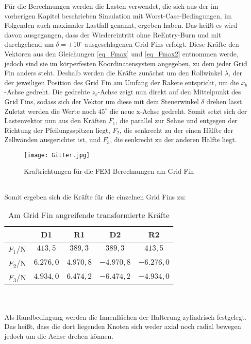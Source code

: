Für die Berechnungen werden die Lasten verwendet, die sich aus der im vorherigen Kapitel beschrieben Simulation mit Worst-Case-Bedingungen, im Folgenden auch maximaler Lastfall genannt, ergeben haben. Das heißt es wird davon ausgegangen, dass der Wiedereintritt ohne ReEntry-Burn und mit durchgehend um $\delta = \pm 10^\circ$ ausgeschlagenen Grid Fins erfolgt. Diese Kräfte den Vektoren aus den Gleichungen \ref{eq_Fmax} und \ref{eq_Fmax2} entnommen werde, jedoch sind sie im körperfesten Koordinatensystem angegeben, zu dem jeder Grid Fin anders steht. Deshalb werden die Kräfte zunächst um den Rollwinkel $\lambda$, der der jeweiligen Position des Grid Fin am Umfang der Rakete entspricht, um die $x_b$-Achse gedreht. Die gedrehte $z_b$-Achse zeigt nun direkt auf den Mittelpunkt des Grid Fins, sodass sich der Vektor um diese mit dem Steuerwinkel $\delta$ drehen lässt. Zuletzt werden die Werte noch $45^\circ$ die neue x-Achse gedreht. Somit setzt sich der Lastenvektor nun aus den Kräften $F_1$, die parallel zur Sehne und entgegen der Richtung der Pfeilungsspitzen liegt, $F_2$, die senkrecht zu der einen Hälfte der Zellwänden ausgerichtet ist, und $F_3$, die senkrecht zu der anderen Hälfte liegt.
\begin{figure}[h] 
	\centering
	\texttt{[image: Gitter.jpg]}
	\caption{Kraftrichtungen für die FEM-Berechnungen am Grid Fin}
	\label{abb_gitter}
\end{figure}\\
Somit ergeben sich die Kräfte für die einzelnen Grid Fins zu:
\begin{table}[ht]
	\centering
	\begin{tabular}{c||c|c|c|c}
		&D1&R1&D2&R2\\
		\hline
		$F_1/$N&$413,5$&$389,3$&$389,3$&$413,5$\\
		$F_2/$N&$6.276,0$&$4.970,8$&$-4.970,8$&$-6.276,0$\\
		$F_3/$N&$4.934,0$&$6.474,2$&$-6.474,2$&$-4.934,0$\\
	\end{tabular}
	\caption{Am Grid Fin angreifende transformierte Kräfte}
\end{table}\\~\\
Als Randbedingung werden die Innenflächen der Halterung zylindrisch festgelegt. Das heißt, dass die dort liegenden Knoten sich weder axial noch radial bewegen jedoch um die Achse drehen können.
